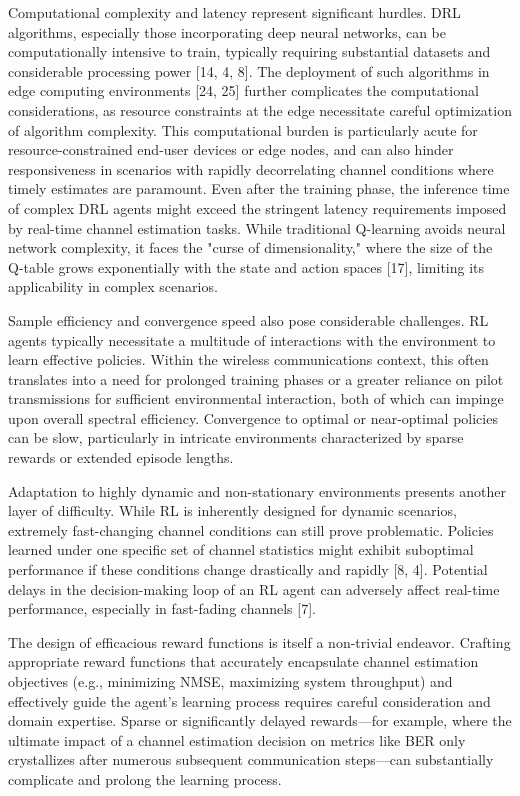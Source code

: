 \documentclass[journal,twocolumn]{IEEEtran}
\begin{document}
Computational complexity and latency represent significant hurdles. DRL algorithms, especially those incorporating deep neural networks, can be computationally intensive to train, typically requiring substantial datasets and considerable processing power [14, 4, 8]. The deployment of such algorithms in edge computing environments [24, 25] further complicates the computational considerations, as resource constraints at the edge necessitate careful optimization of algorithm complexity. This computational burden is particularly acute for resource-constrained end-user devices or edge nodes, and can also hinder responsiveness in scenarios with rapidly decorrelating channel conditions where timely estimates are paramount. Even after the training phase, the inference time of complex DRL agents might exceed the stringent latency requirements imposed by real-time channel estimation tasks. While traditional Q-learning avoids neural network complexity, it faces the "curse of dimensionality," where the size of the Q-table grows exponentially with the state and action spaces [17], limiting its applicability in complex scenarios.

Sample efficiency and convergence speed also pose considerable challenges. RL agents typically necessitate a multitude of interactions with the environment to learn effective policies. Within the wireless communications context, this often translates into a need for prolonged training phases or a greater reliance on pilot transmissions for sufficient environmental interaction, both of which can impinge upon overall spectral efficiency. Convergence to optimal or near-optimal policies can be slow, particularly in intricate environments characterized by sparse rewards or extended episode lengths.

Adaptation to highly dynamic and non-stationary environments presents another layer of difficulty. While RL is inherently designed for dynamic scenarios, extremely fast-changing channel conditions can still prove problematic. Policies learned under one specific set of channel statistics might exhibit suboptimal performance if these conditions change drastically and rapidly [8, 4]. Potential delays in the decision-making loop of an RL agent can adversely affect real-time performance, especially in fast-fading channels [7].

The design of efficacious reward functions is itself a non-trivial endeavor. Crafting appropriate reward functions that accurately encapsulate channel estimation objectives (e.g., minimizing NMSE, maximizing system throughput) and effectively guide the agent's learning process requires careful consideration and domain expertise. Sparse or significantly delayed rewards—for example, where the ultimate impact of a channel estimation decision on metrics like BER only crystallizes after numerous subsequent communication steps—can substantially complicate and prolong the learning process.
\end{document}
